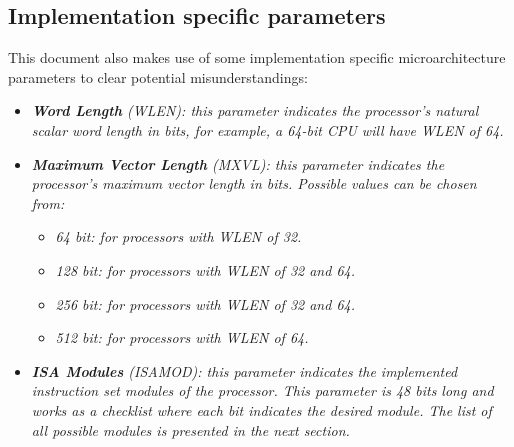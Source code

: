     \subsection[Implementation specific parameters]{Implementation specific parameters}

        \vspace{10pt}

        This document also makes use of some implementation specific microarchitecture parameters to clear potential misunderstandings:

        \begin{itemize}

            \item \textit{\textbf{Word Length} (WLEN): this parameter indicates the processor's natural scalar word length in bits, for example, a 64-bit CPU will have WLEN of 64.}

            \item \textit{\textbf{Maximum Vector Length} (MXVL): this parameter indicates the processor's maximum vector length in bits. Possible values can be chosen from:}

                \begin{itemize}

                    \item \textit{64 bit: for processors with WLEN of 32.}
                    \item \textit{128 bit: for processors with WLEN of 32 and 64.}
                    \item \textit{256 bit: for processors with WLEN of 32 and 64.}
                    \item \textit{512 bit: for processors with WLEN of 64.}

                \end{itemize}

            \item \textit{\textbf{ISA Modules} (ISAMOD): this parameter indicates the implemented instruction set modules of the processor. This parameter is 48 bits long and works as a checklist where each bit indicates the desired module. The list of all possible modules is presented in the next section.}

        \end{itemize}


